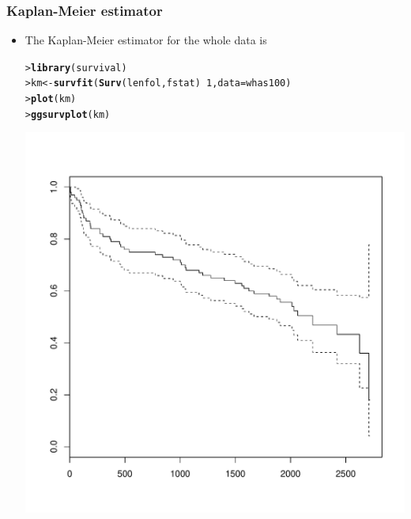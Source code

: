 \documentclass[10pt]{beamer}\usepackage[]{graphicx}\usepackage[]{color}
\makeatletter
\newcommand{\hlnum}[1]{\textcolor[rgb]{0.686,0.059,0.569}{#1}}%
\newcommand{\hlopt}[1]{\textcolor[rgb]{0,0,0}{#1}}%
\newcommand{\hlstd}[1]{\textcolor[rgb]{0.345,0.345,0.345}{#1}}%
\newcommand{\hlkwb}[1]{\textcolor[rgb]{0.69,0.353,0.396}{#1}}%
\newcommand{\hlkwc}[1]{\textcolor[rgb]{0.333,0.667,0.333}{#1}}%
\newcommand{\hlkwd}[1]{\textcolor[rgb]{0.737,0.353,0.396}{\textbf{#1}}}%
\newenvironment{kframe}{%
 \def\at@end@of@kframe{}%
 \ifinner\ifhmode%
  \def\at@end@of@kframe{\end{minipage}}%
  \begin{minipage}{\columnwidth}%
 \fi\fi%
 \def\FrameCommand##1{\hskip\@totalleftmargin \hskip-\fboxsep
 \colorbox{shadecolor}{##1}\hskip-\fboxsep
     \hskip-\linewidth \hskip-\@totalleftmargin \hskip\columnwidth}%
 \MakeFramed {\advance\hsize-\width
   \@totalleftmargin\z@ \linewidth\hsize
   \@setminipage}}%
 {\par\unskip\endMakeFramed%
 \at@end@of@kframe}
\newenvironment{knitrout}{}{} %
\renewenvironment{knitrout}{\setlength{\topsep}{-.2mm}}{}
\makeatother
\begin{document}
\begin{frame}[fragile]
  \frametitle{Kaplan-Meier estimator}
  \begin{itemize}
  \item The Kaplan-Meier estimator for the whole data is
\begin{knitrout}\scriptsize
{}\color{fgcolor}\begin{kframe}
\begin{alltt}
\hlstd{> }\hlkwd{library}\hlstd{(survival)}
\hlstd{> }\hlstd{km} \hlkwb{<-} \hlkwd{survfit}\hlstd{(}\hlkwd{Surv}\hlstd{(lenfol, fstat)} \hlopt{~} \hlnum{1}\hlstd{,} \hlkwc{data} \hlstd{= whas100)}
\hlstd{> }\hlkwd{plot}\hlstd{(km)}
\hlstd{> }\hlkwd{ggsurvplot}\hlstd{(km)}
\end{alltt}
\end{kframe}
\end{knitrout}
    \includegraphics[scale = .28]{km3}\hspace{.2cm}

\end{itemize}
\end{frame}
\end{document}
